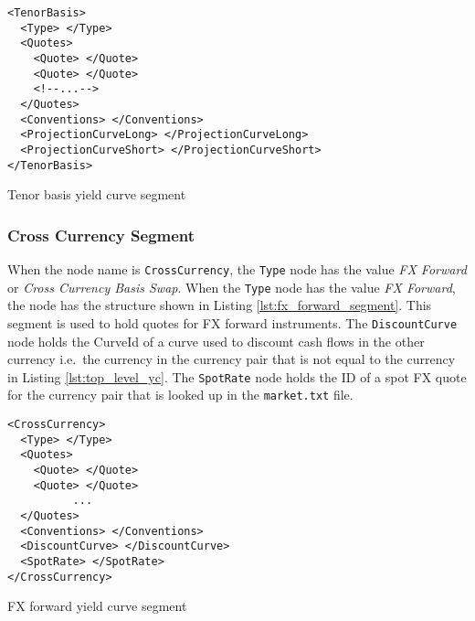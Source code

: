 \begin{listing}[H]
\begin{verbatim}
<TenorBasis>
  <Type> </Type>
  <Quotes>
    <Quote> </Quote>
    <Quote> </Quote>
    <!--...-->
  </Quotes>
  <Conventions> </Conventions>
  <ProjectionCurveLong> </ProjectionCurveLong>
  <ProjectionCurveShort> </ProjectionCurveShort>
</TenorBasis>
\end{verbatim}
\caption{Tenor basis yield curve segment}
\label{lst:tenor_basis_segment}
\end{listing}

\subsubsection*{Cross Currency Segment}
When the node name is \lstinline!CrossCurrency!, the \lstinline!Type! node has the value \emph{FX Forward} or \emph{Cross 
Currency Basis Swap}. When the \lstinline!Type! node has the value \emph{FX Forward}, the node has the structure shown in 
Listing \ref{lst:fx_forward_segment}. This segment is used to hold quotes for FX forward instruments. The 
\lstinline!DiscountCurve! node holds the CurveId of a curve used to discount cash flows in the other currency i.e.\ the 
currency in the currency pair that is not equal to the currency in Listing \ref{lst:top_level_yc}. The 
\lstinline!SpotRate! node holds the ID of a spot FX quote for the currency pair that is looked up in the {\tt market.txt} 
file.

\begin{listing}[H]
\begin{verbatim}
<CrossCurrency>
  <Type> </Type>
  <Quotes>
    <Quote> </Quote>
    <Quote> </Quote>
          ...
  </Quotes>
  <Conventions> </Conventions>
  <DiscountCurve> </DiscountCurve>
  <SpotRate> </SpotRate>
</CrossCurrency>
\end{verbatim}
\caption{FX forward yield curve segment}
\label{lst:fx_forward_segment}
\end{listing}

